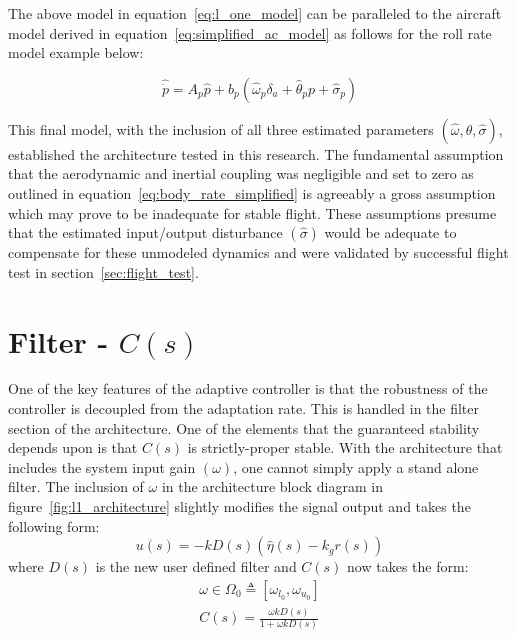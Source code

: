 The above model in equation~\ref{eq:l_one_model} can be paralleled to the aircraft model derived in equation~\ref{eq:simplified_ac_model} as follows for the roll rate model example below:

\begin{equation}
 \hat{\dot{p}}=A_p\hat{p}+b_p\left(\hat{\omega}_p\delta_a+\hat{\theta}_pp+\hat{\sigma}_p\right)
\end{equation}

This final model, with the inclusion of all three estimated parameters $(\hat{\omega}, \hat{\theta}, \hat{\sigma})$, established the architecture tested in this research.  The fundamental assumption that the aerodynamic and inertial coupling was negligible and set to zero as outlined in equation~\ref{eq:body_rate_simplified} is agreeably a gross assumption which may prove to be inadequate for stable flight.  These assumptions presume that the estimated input/output disturbance $(\hat{\sigma})$ would be adequate to compensate for these unmodeled dynamics and were validated by successful flight test in section~\ref{sec:flight_test}.

\section{\Lone Filter - $C(s)$}
One of the key features of the \Lone adaptive controller is that the robustness of the controller is decoupled from the adaptation rate.  This is handled in the filter section of the \Lone architecture.  One of the elements that the guaranteed stability depends upon is that $C(s)$ is strictly-proper stable.  With the architecture that includes the system input gain $(\omega)$, one cannot simply apply a stand alone filter.  The inclusion of $\omega$ in the architecture block diagram in figure~\ref{fig:l1_architecture} slightly modifies the signal output and takes the following form:
\begin{equation}
u(s)=-kD(s)(\hat{\eta}(s)-k_gr(s))
\end{equation}
where $D(s)$ is the new user defined filter and $C(s)$ now takes the form:
\begin{equation}
\begin{split}
\omega \in \Omega_0 \triangleq [\omega_{l_0},\omega_{u_0}]\\
C(s)=\frac{\omega kD(s)}{1+\omega kD(s)}
\end{split}
\end{equation}

